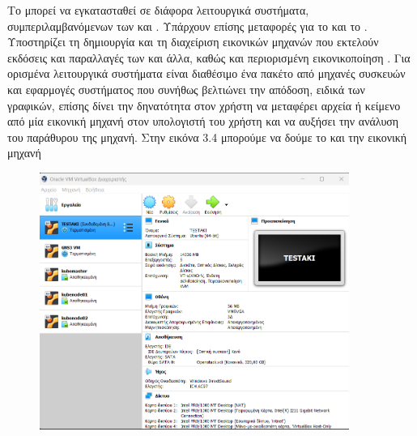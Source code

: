 Το  μπορεί να εγκατασταθεί σε διάφορα λειτουργικά συστήματα, συμπεριλαμβανόμενων των  και .
Υπάρχουν επίσης μεταφορές για το  και το .
Υποστηρίζει τη δημιουργία και τη διαχείριση εικονικών μηχανών που εκτελούν εκδόσεις και παραλλαγές των 
και άλλα, καθώς και περιορισμένη εικονικοποίηση .
Για ορισμένα λειτουργικά συστήματα είναι διαθέσιμο ένα πακέτο  από μηχανές συσκευών και εφαρμογές συστήματος
που συνήθως βελτιώνει την απόδοση, ειδικά των γραφικών, επίσης δίνει την δηνατότητα στον χρήστη να μεταφέρει αρχεία ή κείμενο από μία εικονική μηχανή στον υπολογιστή του χρήστη και να αυξήσει την ανάλυση του παράθυρου της μηχανή. 
Στην εικόνα 3.4 μπορούμε να δούμε το  και την εικονική μηχανή 

\begin{figure}[htb]
	\centering
	\includegraphics[width=0.9\textwidth]{graphics/virtualbox.PNG}
	\caption{ }
\end{figure}





